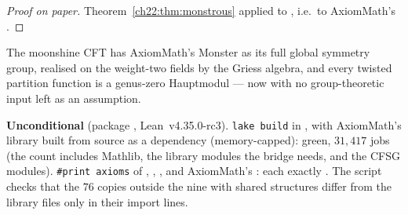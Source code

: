 \begin{proof}[Proof on paper]
Theorem~\ref{ch22:thm:monstrous} applied to , i.e.\ to AxiomMath's .
\end{proof}
\begin{physics}
The moonshine CFT has AxiomMath's Monster as its full global symmetry group, realised on the weight-two fields by the
Griess algebra, and every twisted partition function is a genus-zero Hauptmodul --- now with no group-theoretic input left
as an assumption.
\end{physics}
\begin{status}
\textbf{Unconditional} (package , Lean~v4.35.0-rc3).  \texttt{lake build} in
, with AxiomMath's library built from source as a dependency (memory-capped): green, $31{,}417$ jobs
(the count includes Mathlib, the library modules the bridge needs, and the CFSG modules).  \texttt{\#print axioms} of
, , ,
 and AxiomMath's : each
exactly .  The script  checks that the
$76$ copies outside the nine with shared structures differ from the library files only in their import lines.
\end{status}
